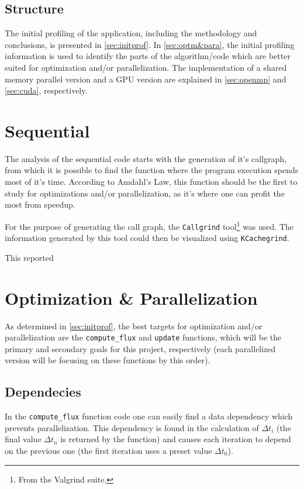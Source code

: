 \documentclass[9pt,twocolumn]{scrartcl}
\begin{document}
\subsection{Structure}%
The initial profiling of the application, including the methodology and conclusions, is presented in \autoref{sec:initprof}. In \autoref{sec:optm&para}, the initial profiling information is used to identify the parts of the algorithm/code which are better suited for optimization and/or parallelization. The implementation of a shared memory parallel version and a GPU version are explained in \autoref{sec:openmp}  and \autoref{sec:cuda}, respectively.

\section{Sequential}%
\label{sec:initprof}
The analysis of the sequential code starts with the generation of it's callgraph, from which it is possible to find the function where the program execution spends most of it's time. According to Amdahl's Law, this function should be the first to study for optimizations and/or parallelization, as it's where one can profit the most from speedup.

For the purpose of generating the call graph, the \texttt{Callgrind} tool\footnote{From the Valgrind suite.} was used. The information generated by this tool could then be visualized using \texttt{KCachegrind}.

This reported%

\section{Optimization \& Parallelization}
\label{sec:optm&para}
As determined in \autoref{sec:initprof}, the best targets for optimization and/or parallelization are the \texttt{compute\_flux} and \texttt{update} functions, which will be the primary and secondary goals for this project, respectively (each parallelized version will be focusing on these functions by this order).

\subsection{Dependecies}
In the \texttt{compute\_flux} function code one can easily find a data dependency which prevents parallelization. This dependency is found in the calculation of $\Delta t_{i}$ (the final value $\Delta t_{n}$ is returned by the function) and causes each iteration to depend on the previous one (the first iteration uses a preset value $\Delta t_{0}$).
\end{document}
